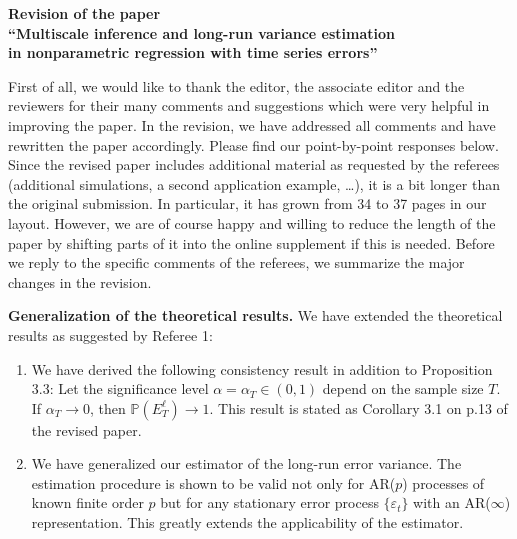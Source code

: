 \documentclass[a4paper,12pt]{article}
\begin{document}
\begin{center} 
{\large \bf Revision of the paper} \\[0.1cm]
{\large \bf ``Multiscale inference and long-run variance estimation} \\[0.1cm]
{\large \bf in nonparametric regression with time series errors''} 
\end{center}
\vspace{7pt}



First of all, we would like to thank the editor, the associate editor and the reviewers for their many comments and suggestions which were very helpful in improving the paper. In the revision, we have addressed all comments and have rewritten the paper accordingly. Please find our point-by-point responses below. 
Since the revised paper includes additional material as requested by the referees (additional simulations, a second application example, \dots), it is a bit longer than the original submission. In particular, it has grown from 34 to 37 pages in our layout. However, we are of course happy and willing to reduce the length of the paper by shifting parts of it into the online supplement if this is needed. 
Before we reply to the specific comments of the referees, we summarize the major changes in the revision.
\vspace{10pt}


\textbf{Generalization of the theoretical results.} We have extended the theoretical results as suggested by Referee 1:
\begin{enumerate}[label=(\roman*), leftmargin=0.8cm]

\item We have derived the following consistency result in addition to Proposition 3.3: Let the significance level $\alpha = \alpha_T \in (0,1)$ depend on the sample size $T$. If $\alpha_T \rightarrow 0$, then $\mathbb{P}({E}_T^{\ell}) \rightarrow 1$. This result is stated as Corollary 3.1 on p.13 of the revised paper. 

\item We have generalized our estimator of the long-run error variance. The estimation procedure is shown to be valid not only for AR($p$) processes of known finite order $p$ but for any stationary error process $\{\varepsilon_t\}$ with an AR($\infty$) representation. This greatly extends the applicability of the estimator. 
\end{enumerate}
\vspace{3pt}
\end{document}
